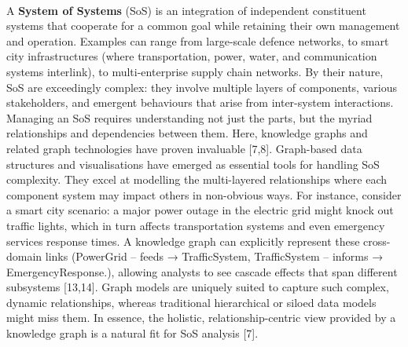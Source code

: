         \paragraph{}
        A \textbf{System of Systems} (SoS) is an integration of independent constituent systems that cooperate for a common goal while retaining their own management and operation. Examples can range from large-scale defence networks, to smart city infrastructures (where transportation, power, water, and communication systems interlink), to multi-enterprise supply chain networks. By their nature, SoS are exceedingly complex: they involve multiple layers of components, various stakeholders, and emergent behaviours that arise from inter-system interactions. Managing an SoS requires understanding not just the parts, but the myriad relationships and dependencies between them. Here, knowledge graphs and related graph technologies have proven invaluable [7,8]. Graph-based data structures and visualisations have emerged as essential tools for handling SoS complexity. They excel at modelling the multi-layered relationships where each component system may impact others in non-obvious ways. For instance, consider a smart city scenario: a major power outage in the electric grid might knock out traffic lights, which in turn affects transportation systems and even emergency services response times. A knowledge graph can explicitly represent these cross-domain links (PowerGrid – feeds → TrafficSystem, TrafficSystem – informs → EmergencyResponse.), allowing analysts to see cascade effects that span different subsystems [13,14]. Graph models are uniquely suited to capture such complex, dynamic relationships, whereas traditional hierarchical or siloed data models might miss them. In essence, the holistic, relationship-centric view provided by a knowledge graph is a natural fit for SoS analysis [7].
        
        \newpage
